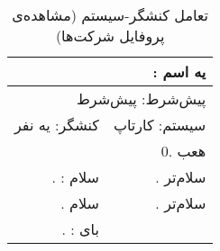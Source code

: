 \documentclass[12pt,svgnames,oneside]{book}
\newcommand{\uc}[1]{\lr{U{#1}}}
\newcommand{\tucbw}{\lr{TUCBW}}
\newcommand{\tucew}{\lr{TUCEW}}
\newcommand{\actorsystem}[1]{
کنشگر: {#1} &
سیستم: کارتاپ \\
}
\newcommand{\zerostep}[1]{
& 0. {#1} \\
}
\newcounter{UseCaseCounter}
\newcommand{\step}[1]{
\stepcounter{UseCaseCounter}\arabic{UseCaseCounter}. {#1}
}
\newcommand{\ucname}[2]{
\multicolumn{2}{|r|}{\uc{0{#1}}: {#2}} \\
}
\newcommand{\preif}[1]{
\multicolumn{2}{|r|}{پیش‌شرط:‌ {#1}} \\
}
\begin{document}
\begin{table}[H]
\caption{تعامل کنشگر-سیستم  (مشاهده‌ی پروفایل شرکت‌ها)}
\begin{center}
\begin{tabular}{|r|r|}
\hline

\ucname{n}{یه اسم}
\hline

\preif{پیش‌شرط}
\hline

\actorsystem{یه نفر}
\hline

\zerostep{هعب}
\hline

\step{\tucbw: سلام} & 
\step{سلام‌تر} \\
\hline

\step{سلام} & 
\step{سلام‌تر} \\
\hline

\step{\tucew: بای} & 
\\
\hline

\end{tabular}
\end{center}
\end{table}



\end{document}
